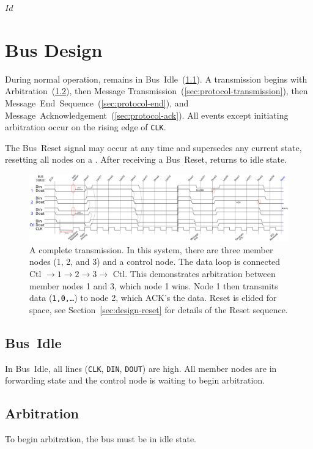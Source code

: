 \svnInfo $Id$

\section{Bus Design}
\label{sec:protocol}
During normal operation, \bus remains in Bus~Idle~(\ref{sec:protocol-idle}).
A transmission begins with Arbitration~(\ref{sec:protocol-arbitration}), then
Message Transmission~(\ref{sec:protocol-transmission}), then
Message~End~Sequence~(\ref{sec:protocol-end}),
and Message~Acknowledgement~(\ref{sec:protocol-ack}).
All events except initiating arbitration occur on the rising
edge of {\tt CLK}.

The Bus~Reset signal may occur at any time and supersedes any current state,
resetting all nodes on a \bus. After receiving a Bus~Reset, \bus returns to
{\sc idle} state.

\begin{figure}[h!]
\includegraphics[width=\linewidth]{img/timing}
\caption{A complete transmission. In this system, there are
three member nodes (1, 2, and 3) and a control node. The data loop is connected
Ctl $\rightarrow 1 \rightarrow 2 \rightarrow 3 \rightarrow$ Ctl. This
demonstrates arbitration between member nodes 1 and 3, which node 1 wins. Node
1 then transmits data ({\tt 1,0,\ldots}) to node 2, which ACK's the data.
Reset is elided for space, see Section~\ref{sec:design-reset} for details of
the Reset sequence.
}
\label{fig:transmission}
\end{figure}

\subsection{Bus~Idle}
\label{sec:protocol-idle}
In \bus Bus~Idle, all lines ({\tt CLK}, {\tt DIN}, {\tt DOUT}) are high.
All member nodes are in forwarding state and the control node is waiting to
begin arbitration.

\subsection{Arbitration}
\label{sec:protocol-arbitration}
To begin arbitration, the bus must be in idle state.

